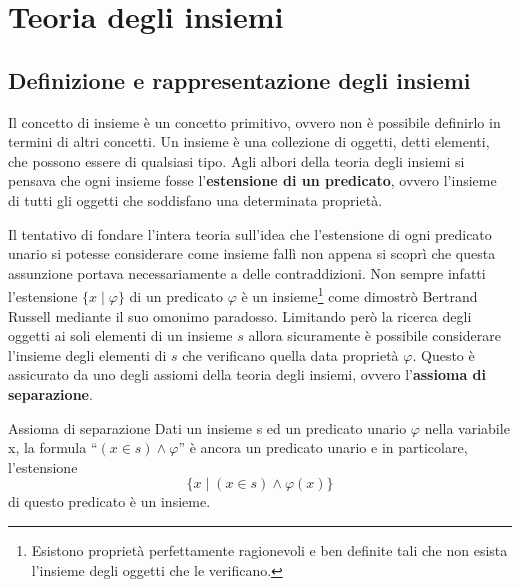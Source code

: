 \chapter{Teoria degli insiemi}
\section{Definizione e rappresentazione degli insiemi}
Il concetto di insieme è un concetto primitivo, ovvero non è possibile definirlo in termini di altri concetti. Un insieme è una collezione di oggetti, detti elementi, che possono essere di qualsiasi tipo. Agli albori della teoria degli insiemi si pensava che ogni insieme fosse l'\textbf{estensione di un predicato}, ovvero l'insieme di tutti gli oggetti che soddisfano una determinata proprietà.


Il tentativo di fondare l'intera teoria sull'idea che l'estensione di ogni predicato unario si potesse considerare come insieme fallì non appena si scoprì che questa assunzione portava necessariamente a delle contraddizioni. Non sempre infatti l'estensione $\{x \; | \; \varphi \}$ di un predicato $\varphi$ è un insieme\footnote{Esistono proprietà perfettamente ragionevoli e ben definite tali che non esista l'insieme degli oggetti che le verificano.} come dimostrò Bertrand Russell mediante il suo omonimo paradosso. Limitando però la ricerca degli oggetti ai soli elementi di un insieme $s$ allora sicuramente è possibile considerare l'insieme degli elementi di $s$ che verificano quella data proprietà $\varphi$.  Questo è assicurato da uno degli assiomi della teoria degli insiemi, ovvero l'\textbf{assioma di separazione}.

\begin{axiombox}{Assioma di separazione}
	Dati un insieme s ed un predicato unario $\varphi$ nella variabile x, la formula ``$(x \in s) \wedge \varphi$'' è ancora un predicato unario e in particolare, l'estensione \[\{x \; | \; (x \in s)\wedge \varphi(x) \}\] di questo predicato è un insieme.
\end{axiombox}

